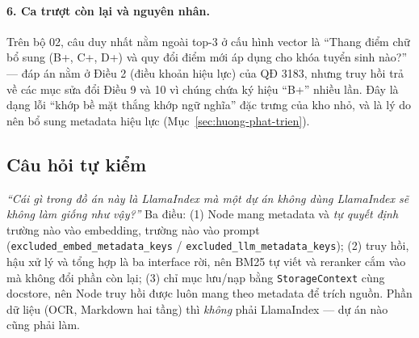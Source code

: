 \paragraph{6. Ca trượt còn lại và nguyên nhân.} Trên bộ 02, câu duy nhất nằm ngoài top-3 ở cấu hình
vector là ``Thang điểm chữ bổ sung (B+, C+, D+) và quy đổi điểm mới áp dụng cho khóa tuyển sinh
nào?'' --- đáp án nằm ở Điều 2 (điều khoản hiệu lực) của QĐ 3183, nhưng truy hồi trả về các mục sửa
đổi Điều 9 và 10 vì chúng chứa ký hiệu ``B+'' nhiều lần. Đây là dạng lỗi ``khớp bề mặt thắng khớp
ngữ nghĩa'' đặc trưng của kho nhỏ, và là lý do nên bổ sung metadata hiệu lực (Mục~\ref{sec:huong-phat-trien}).


\subsection{Câu hỏi tự kiểm}

\emph{``Cái gì trong đồ án này là LlamaIndex mà một dự án không dùng LlamaIndex sẽ không làm giống như vậy?''}
Ba điều: (1) Node mang metadata và \emph{tự quyết định} trường nào vào embedding, trường nào vào prompt
(\texttt{excluded\_embed\_metadata\_keys} / \texttt{excluded\_llm\_metadata\_keys}); (2) truy hồi, hậu xử lý
và tổng hợp là ba interface rời, nên BM25 tự viết và reranker cắm vào mà không đổi phần còn lại; (3) chỉ
mục lưu/nạp bằng \texttt{StorageContext} cùng docstore, nên Node truy hồi được luôn mang theo metadata để
trích nguồn. Phần dữ liệu (OCR, Markdown hai tầng) thì \emph{không} phải LlamaIndex --- dự án nào cũng
phải làm.
